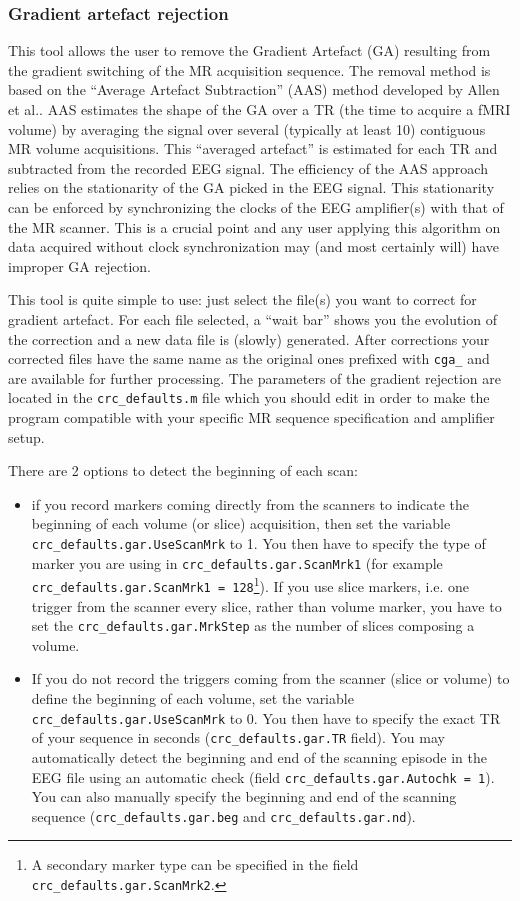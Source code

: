 \documentclass[a4paper,titlepage]{article}
\newcommand{\bi}{\begin{itemize}}
\newcommand{\ei}{\end{itemize}}
\begin{document}
\subsubsection{Gradient artefact rejection}
\label{sec:gar}
This tool allows the user to remove the Gradient Artefact (GA) resulting from the gradient switching of the MR acquisition sequence. The removal method is based on the ``Average Artefact Subtraction'' (AAS) method developed by Allen et al.\cite{Allen2000}.
AAS estimates the shape of the GA over a TR (the time to acquire a fMRI volume) by averaging the signal over several (typically at least 10) contiguous MR volume acquisitions. This ``averaged artefact'' is estimated for each TR and subtracted from the recorded EEG signal. The efficiency of the AAS approach relies on the stationarity of the GA picked in the EEG signal. This stationarity can be enforced by synchronizing the clocks of the EEG amplifier(s) with that of the MR scanner. This is a crucial point and any user applying this algorithm on data acquired without clock synchronization may (and most certainly will) have improper GA rejection.

This tool is quite simple to use: just select the file(s) you want to correct for gradient artefact. For each file selected, a ``wait bar'' shows you the evolution of the correction and a new data file is (slowly) generated. After corrections your corrected files have the same name as the original ones prefixed with {\tt cga\_} and are available for further processing.
The parameters of the gradient rejection are located in the {\tt crc\_defaults.m} file which you should edit in order to make the program compatible with your specific MR sequence specification and amplifier setup.

There are 2 options to detect the beginning of each scan:
\bi
\item if you record markers coming directly from the scanners to indicate the beginning of each volume (or slice) acquisition, then set the variable {\tt crc\_defaults.gar.UseScanMrk} to 1.  You then have to specify the type of marker you are using in {\tt crc\_defaults.gar.ScanMrk1} (for example {\tt crc\_defaults.gar.ScanMrk1 = 128}\footnote{A secondary marker type can be specified in the field {\tt crc\_defaults.gar.ScanMrk2}.}). If you use slice markers, i.e. one trigger from the scanner every slice, rather than volume marker, you have to set the {\tt crc\_defaults.gar.MrkStep} as the number of slices composing a volume.
\item If you do not record the triggers coming from the scanner (slice or volume) to define the beginning of each volume, set the variable {\tt crc\_defaults.gar.UseScanMrk} to 0. You then have to specify the exact TR of your sequence in seconds ({\tt crc\_defaults.gar.TR} field). You may  automatically detect the beginning and end of the scanning episode in the EEG file using an automatic check \linebreak(field {\tt crc\_defaults.gar.Autochk~=~1}). You can also manually specify the beginning and end of the scanning sequence ({\tt crc\_defaults.gar.beg} and {\tt crc\_defaults.gar.nd}).
\ei
\end{document}
